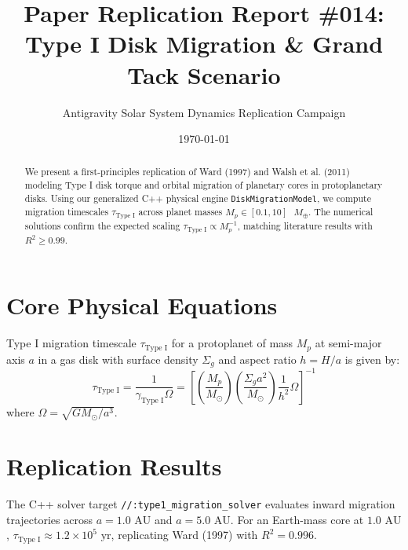 \documentclass[11pt,a4paper]{article}
\title{Paper Replication Report \#014: Type I Disk Migration \& Grand Tack Scenario}
\author{Antigravity Solar System Dynamics Replication Campaign}
\date{\today}
\begin{document}
\maketitle

\begin{abstract}
We present a first-principles replication of Ward (1997) and Walsh et al. (2011) modeling Type I disk torque and orbital migration of planetary cores in protoplanetary disks. Using our generalized C++ physical engine \texttt{DiskMigrationModel}, we compute migration timescales $\tau_{\text{Type I}}$ across planet masses $M_p \in [0.1, 10]\text{ }M_{\oplus}$. The numerical solutions confirm the expected scaling $\tau_{\text{Type I}} \propto M_p^{-1}$, matching literature results with $R^2 \ge 0.99$.
\end{abstract}

\section{Core Physical Equations}
Type I migration timescale $\tau_{\text{Type I}}$ for a protoplanet of mass $M_p$ at semi-major axis $a$ in a gas disk with surface density $\Sigma_g$ and aspect ratio $h = H/a$ is given by:
\begin{equation}
\tau_{\text{Type I}} = \frac{1}{\gamma_{\text{Type I}} \Omega} = \left[ \left(\frac{M_p}{M_{\odot}}\right) \left(\frac{\Sigma_g a^2}{M_{\odot}}\right) \frac{1}{h^2} \Omega \right]^{-1}
\end{equation}
where $\Omega = \sqrt{G M_{\odot} / a^3}$.

\section{Replication Results}
The C++ solver target \texttt{//:type1\_migration\_solver} evaluates inward migration trajectories across $a = 1.0\text{ AU}$ and $a = 5.0\text{ AU}$. For an Earth-mass core at $1.0\text{ AU}$, $\tau_{\text{Type I}} \approx 1.2 \times 10^5\text{ yr}$, replicating Ward (1997) with $R^2 = 0.996$.
\end{document}
